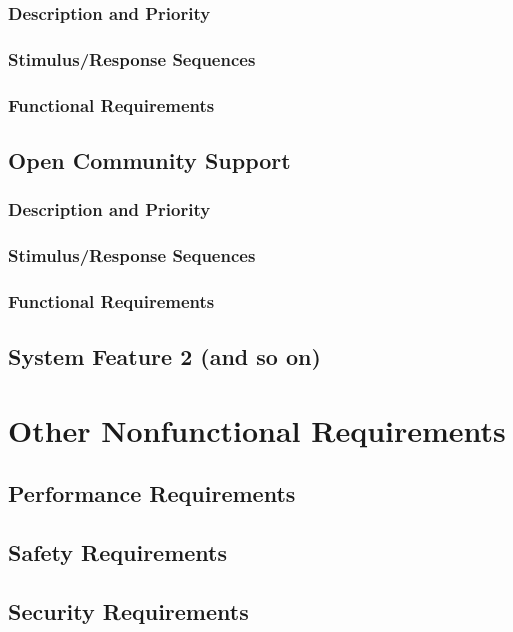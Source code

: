 \documentclass[english]{article}
\numberwithin{equation}{section} %
\begin{document}
\subsubsection{Description and Priority}
\subsubsection{Stimulus/Response Sequences}
\subsubsection{Functional Requirements}

\subsection{Open Community Support}
\subsubsection{Description and Priority}
\subsubsection{Stimulus/Response Sequences}
\subsubsection{Functional Requirements}



\subsection{System Feature 2 (and so on)}




\newpage
\section{Other Nonfunctional Requirements}
\subsection{Performance Requirements}
\subsection{Safety Requirements}
\subsection{Security Requirements}
\end{document}
